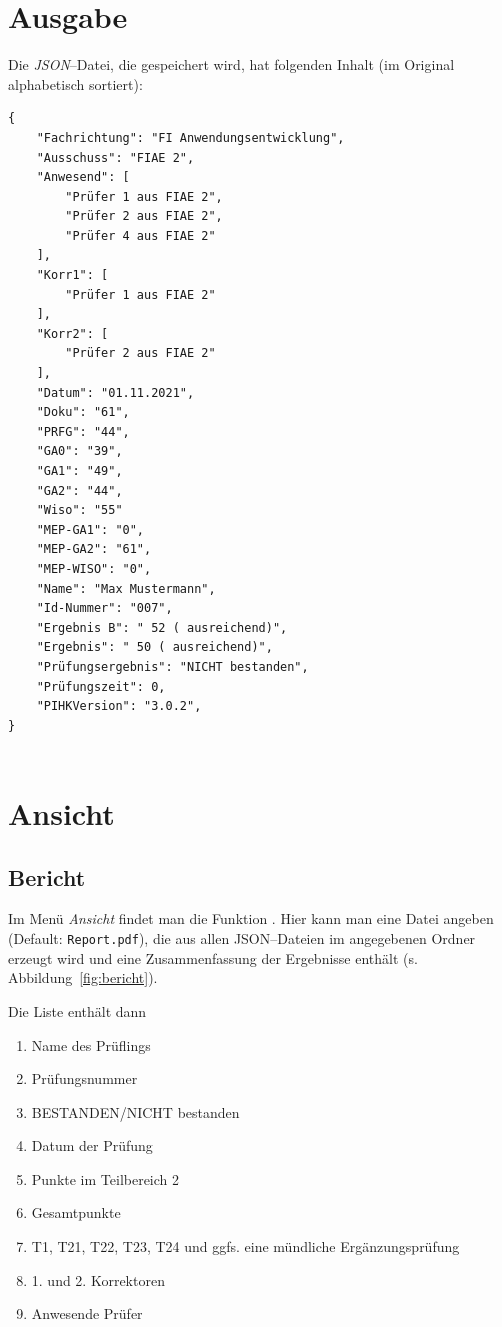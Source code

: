 \documentclass[a4paper,notitlepage,parskip=half]{scrartcl}
\newcommand{\cfile}[1]{{\texttt{#1}}}
\begin{document}
\section{Ausgabe}
Die \emph{JSON}--Datei, die gespeichert wird, hat folgenden Inhalt (im Original alphabetisch sortiert):
\nopagebreak[4]

\begin{minipage}[t]{\textwidth}
\begin{lstlisting}[numbers=none,caption={\cfile{Gesicherte Datei: $20160621Max\_Mustermann13145678.txt$}},label=lst:datei]
{
    "Fachrichtung": "FI Anwendungsentwicklung",
    "Ausschuss": "FIAE 2",
    "Anwesend": [
        "Prüfer 1 aus FIAE 2",
        "Prüfer 2 aus FIAE 2",
        "Prüfer 4 aus FIAE 2"
    ],
    "Korr1": [
        "Prüfer 1 aus FIAE 2"
    ],
    "Korr2": [
        "Prüfer 2 aus FIAE 2"
    ],
    "Datum": "01.11.2021",
    "Doku": "61",
    "PRFG": "44",
    "GA0": "39",
    "GA1": "49",
    "GA2": "44",
    "Wiso": "55"
    "MEP-GA1": "0",
    "MEP-GA2": "61",
    "MEP-WISO": "0",
    "Name": "Max Mustermann",
    "Id-Nummer": "007",
    "Ergebnis B": " 52 ( ausreichend)",
    "Ergebnis": " 50 ( ausreichend)",
    "Prüfungsergebnis": "NICHT bestanden",
    "Prüfungszeit": 0,
    "PIHKVersion": "3.0.2",
}


\end{lstlisting}
\end{minipage}

\section{Ansicht}
\subsection{Bericht}
Im Menü \emph{Ansicht} findet man die Funktion .
Hier kann man eine Datei angeben (Default: \texttt{Report.pdf}), die aus allen JSON--Dateien im angegebenen Ordner erzeugt wird und eine Zusammenfassung der Ergebnisse enthält (s. Abbildung~\ref{fig:bericht}).

Die Liste enthält dann

\begin{enumerate}
 \item Name des Prüflings
 \item Prüfungsnummer
 \item BESTANDEN/NICHT bestanden
 \item Datum der Prüfung
 \item Punkte im Teilbereich 2
 \item Gesamtpunkte
 \item T1, T21, T22, T23, T24 und ggfs. eine mündliche Ergänzungsprüfung
 \item 1. und 2. Korrektoren
 \item Anwesende Prüfer
 \end{enumerate} 
\end{document}
